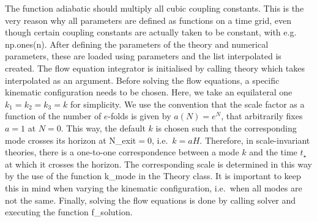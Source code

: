 \documentclass[11pt]{article}
\numberwithin{equation}{section} %
\begin{document}
The function \textsf{adiabatic} should multiply all cubic coupling constants. This is the very reason why all parameters are defined as functions on a time grid, even though certain coupling constants are actually taken to be constant, with e.g. \textsf{np.ones(n)}. After defining the parameters of the theory and numerical parameters, these are loaded using \textsf{parameters} and the list \textsf{interpolated} is created. The flow equation integrator is initialised by calling \textsf{theory} which takes \textsf{interpolated} as an argument. Before solving the flow equations, a specific kinematic configuration needs to be chosen. Here, we take an equilateral one $k_1=k_2=k_3 = k$ for simplicity. We use the convention that the scale factor as a function of the number of $e$-folds is given by $a(N) = e^{N}$, that arbitrarily fixes $a=1$ at $N=0$. This way, the default $k$ is chosen such that the corresponding mode crosses its horizon at \textsf{N\_exit}$=0$, i.e.~$k = a H$. Therefore, in scale-invariant theories, there is a one-to-one correspondence between a mode $k$ and the time $t_\star$ at which it crosses the horizon. The corresponding scale is determined in this way by the use of the function \textsf{k\_mode} in the \textsf{Theory} class. It is important to keep this in mind when varying the kinematic configuration, i.e.~when all modes are not the same. Finally, solving the flow equations is done by calling \textsf{solver} and executing the function \textsf{f\_solution}. 
\end{document}
